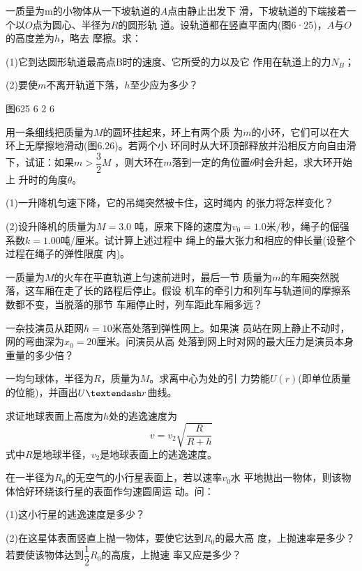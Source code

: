 \begin{exercises}
\exercise 一质量为m的小物体从一下坡轨道的$ A $点由静止出发下
滑，下坡轨道的下端接着一个以$ O $点为圆心、半径为$ R $的圆形轨
道。设轨道都在竖直平面内(图6·25)，$ A $与$ O $的高度差为$ h $，略去
摩擦。求：

(1)它到达圆形轨道最高点B时的速度、它所受的力以及它
作用在轨道上的力$ N _ { B } $；

(2)要使$ m $不离开轨道下落，$ h $至少应为多少？

图625 6 2 6

\exercise 用一条细线把质量为$ M $的圆环挂起来，环上有两个质
为$ m $的小环，它们可以在大环上无摩擦地滑动(图6.26)。若两个小
环同时从大环顶部释放并沿相反方向自由滑下，试证：如果$ m >
\dfrac { 3 } { 2 } M $
，则大环在$ m $落到一定的角位置$ \theta $时会升起，求大环开始上
升时的角度$ \theta $。

\exercise (1)一升降机匀速下降，它的吊绳突然被卡住，这时绳内
的张力将怎样变化？

(2)设升降机的质量为$ M = 3.0 $ 吨，原来下降的速度为$ v _ { 0 } =
1.0 $米/秒，绳子的倔强系数$ k = 1.00 $吨/厘米。试计算上述过程中
绳上的最大张力和相应的伸长量(设整个过程在绳子的弹性限度
内)。

\exercise 一质量为$ M $的火车在平直轨道上匀速前进时，最后一节
质量为$ m $的车厢突然脱落，这车厢在走了长的路程后停止。假设
机车的牵引力和列车与轨道间的摩擦系数都不变，当脱落的那节
车厢停止时，列车距此车厢多远？

\exercise 一杂技演员从距网$ h = 1 0 $米高处落到弹性网上。如果演
员站在网上静止不动时，网的弯曲深为$ x _ { 0 } = 2 0 $厘米。问演员从高
处落到网上时对网的最大压力是演员本身重量的多少倍？

\exercise 一均匀球体，半径为$ R $，质量为$ M $。求离中心为处的引
力势能$ U(r) $(即单位质量的位能)，并画出$ U \textendash r $曲线。

\exercise 求证地球表面上高度为$ h $处的逃逸速度为
\begin{equation*}
 v = v _ { 2 } \sqrt { \frac { R } { R + h } }
\end{equation*}
式中$ R $是地球半径，$ v _ { 2 } $是地球表面上的逃逸速度。

\exercise 在一半径为$ R_0 $的无空气的小行星表面上，若以速率$ v_0 $水
平地抛出一物体，则该物体恰好环绕该行星的表面作匀速圆周运
动。问：

(1)这小行星的逃逸速度是多少？

(2)在这星体表面竖直上抛一物体，要使它达到$ R_0 $的最大高
度，上抛速率是多少？若要使该物体达到$
\dfrac { 1 } { 2 } R_0 $的高度，上抛速
率又应是多少？


\end{exercises}
